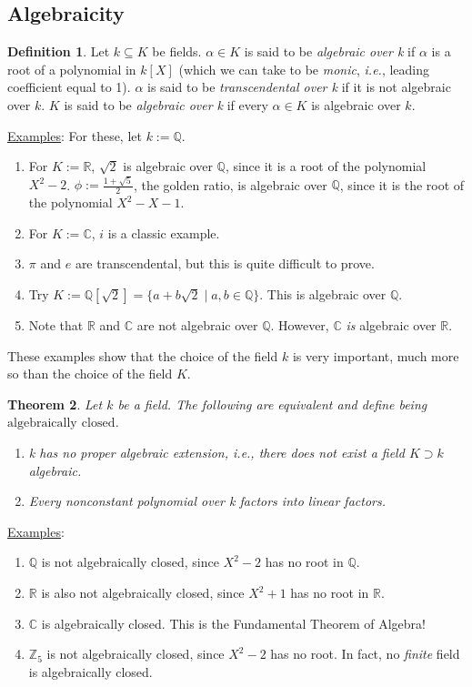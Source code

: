 \documentclass[12pt]{article}
\newcommand{\z}{\mathbb{Z}}
\newcommand{\q}{\mathbb{Q}}
\newcommand{\cx}{\mathbb{C}}
\newcommand{\real}{\mathbb{R}}
\newcommand{\ita}[1]{\textit{#1}}
\newtheorem{theorem}{Theorem}[section]
\theoremstyle{definition}
\newtheorem{definition}[theorem]{Definition}
\begin{document}
\subsection{Algebraicity}
\begin{definition}
    Let $k\subseteq K$ be fields. $\alpha\in K$ is said to be \ita{algebraic over k} if $\alpha$ is a root of a polynomial in $k[X]$ (which we can take to be \ita{monic}, \ita{i.e.}, leading coefficient equal to 1). $\alpha$ is said to be \ita{transcendental over k} if it is not algebraic over $k$. $K$ is said to be \ita{algebraic over k} if every $\alpha\in K$ is algebraic over $k$.
\end{definition}
\underline{Examples}: For these, let $k:=\q$.
\begin{enumerate}
    \item For $K:=\real$, $\sqrt{2}$ is algebraic over $\q$, since it is a root of the polynomial $X^2-2$. $\phi:=\frac{1+\sqrt{5}}{2}$, the golden ratio, is algebraic over $\q$, since it is the root of the polynomial $X^2-X-1$. 
    \item For $K:=\cx$, $i$ is a classic example.
    \item $\pi$ and $e$ are transcendental, but this is quite difficult to prove.
    \item Try $K:=\q[\sqrt{2}]=\{a+b\sqrt{2}\mid a,b\in\q\}$. This is algebraic over $\q$.
    \item Note that $\real$ and $\cx$ are not algebraic over $\q$. However, $\cx$ \ita{is} algebraic over $\real$.
\end{enumerate}
These examples show that the choice of the field $k$ is very important, much more so than the choice of the field $K$.
\begin{theorem}
    Let $k$ be a field. The following are equivalent and define being $\mathrm{algebraically}$ $\mathrm{closed}$.
    \begin{enumerate}
        \item k has no proper algebraic extension, i.e., there does not exist a field $K\supset k$ algebraic.
        \item Every nonconstant polynomial over k factors into linear factors.
    \end{enumerate}
\end{theorem}
\underline{Examples}:
\begin{enumerate}
    \item $\q$ is not algebraically closed, since $X^2-2$ has no root in $\q$.
    \item $\real$ is also not algebraically closed, since $X^2+1$ has no root in $\real$.
    \item $\cx$ is algebraically closed. This is the Fundamental Theorem of Algebra!
    \item $\z_5$ is not algebraically closed, since $X^2-2$ has no root. In fact, no \ita{finite} field is algebraically closed.
\end{enumerate}
\end{document}
